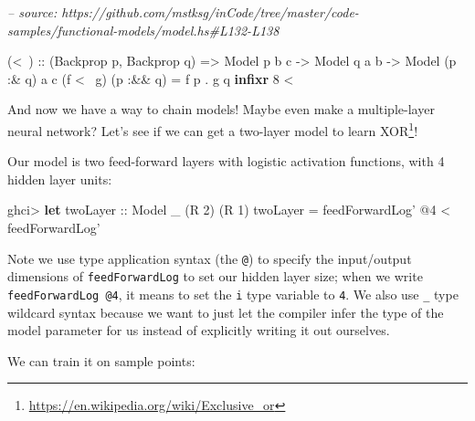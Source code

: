 \documentclass[]{article}
\newenvironment{Shaded}{}{}
\newcommand{\CommentTok}[1]{\textcolor[rgb]{0.38,0.63,0.69}{\textit{#1}}}
\newcommand{\DataTypeTok}[1]{\textcolor[rgb]{0.56,0.13,0.00}{#1}}
\newcommand{\DecValTok}[1]{\textcolor[rgb]{0.25,0.63,0.44}{#1}}
\newcommand{\FunctionTok}[1]{\textcolor[rgb]{0.02,0.16,0.49}{#1}}
\newcommand{\KeywordTok}[1]{\textcolor[rgb]{0.00,0.44,0.13}{\textbf{#1}}}
\newcommand{\NormalTok}[1]{#1}
\newcommand{\OtherTok}[1]{\textcolor[rgb]{0.00,0.44,0.13}{#1}}
\renewcommand{\href}[2]{#2\footnote{\url{#1}}}
\begin{document}
\begin{Shaded}
\begin{Highlighting}[]
\CommentTok{-- source: https://github.com/mstksg/inCode/tree/master/code-samples/functional-models/model.hs#L132-L138}

\NormalTok{(}\FunctionTok{<~}\NormalTok{)}
\OtherTok{    ::}\NormalTok{ (}\DataTypeTok{Backprop}\NormalTok{ p, }\DataTypeTok{Backprop}\NormalTok{ q)}
    \OtherTok{=>} \DataTypeTok{Model}\NormalTok{  p       b c}
    \OtherTok{->} \DataTypeTok{Model}\NormalTok{       q  a b}
    \OtherTok{->} \DataTypeTok{Model}\NormalTok{ (p }\FunctionTok{:&}\NormalTok{ q) a c}
\NormalTok{(f }\FunctionTok{<~}\NormalTok{ g) (p }\FunctionTok{:&&}\NormalTok{ q) }\FunctionTok{=}\NormalTok{ f p }\FunctionTok{.}\NormalTok{ g q}
\KeywordTok{infixr} \DecValTok{8} \FunctionTok{<~}
\end{Highlighting}
\end{Shaded}

And now we have a way to chain models! Maybe even make a multiple-layer neural
network? Let's see if we can get a two-layer model to learn
\href{https://en.wikipedia.org/wiki/Exclusive_or}{XOR}!

Our model is two feed-forward layers with logistic activation functions, with 4
hidden layer units:

\begin{Shaded}
\begin{Highlighting}[]
\NormalTok{ghci}\FunctionTok{>} \KeywordTok{let}\OtherTok{ twoLayer ::} \DataTypeTok{Model}\NormalTok{ _ (}\DataTypeTok{R} \DecValTok{2}\NormalTok{) (}\DataTypeTok{R} \DecValTok{1}\NormalTok{)}
\NormalTok{          twoLayer }\FunctionTok{=}\NormalTok{ feedForwardLog' }\FunctionTok{@}\DecValTok{4} \FunctionTok{<~}\NormalTok{ feedForwardLog'}
\end{Highlighting}
\end{Shaded}

Note we use type application syntax (the \texttt{@}) to specify the input/output
dimensions of \texttt{feedForwardLog\textquotesingle{}} to set our hidden layer
size; when we write \texttt{feedForwardLog\textquotesingle{}\ @4}, it means to
set the \texttt{i} type variable to \texttt{4}. We also use \texttt{\_} type
wildcard syntax because we want to just let the compiler infer the type of the
model parameter for us instead of explicitly writing it out ourselves.

We can train it on sample points:
\end{document}
